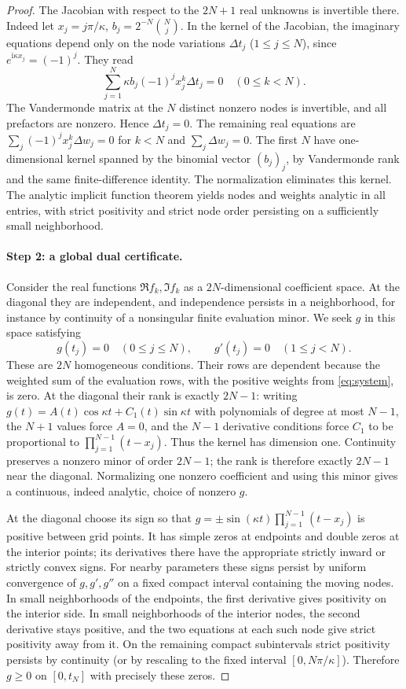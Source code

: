 \documentclass[11pt]{article}
\theoremstyle{remark}\newtheorem{remark}[theorem]{Remark}
\newcommand{\ii}{\mathrm i}
\begin{document}
\begin{proof}
The Jacobian with respect to the $2N+1$ real unknowns is invertible there. Indeed let $x_j=j\pi/\kappa$, $b_j=2^{-N}\binom Nj$. In the kernel of the Jacobian, the imaginary equations depend only on the node variations $\Delta t_j$ ($1\le j\le N$), since $e^{\ii\kappa x_j}=(-1)^j$. They read
\[
 \sum_{j=1}^N \kappa b_j(-1)^j x_j^k\Delta t_j=0\quad(0\le k<N).
\]
The Vandermonde matrix at the $N$ distinct nonzero nodes is invertible, and all prefactors are nonzero. Hence $\Delta t_j=0$. The remaining real equations are $\sum_j(-1)^j x_j^k\Delta w_j=0$ for $k<N$ and $\sum_j\Delta w_j=0$. The first $N$ have one-dimensional kernel spanned by the binomial vector $(b_j)_j$, by Vandermonde rank and the same finite-difference identity. The normalization eliminates this kernel. The analytic implicit function theorem yields nodes and weights analytic in all entries, with strict positivity and strict node order persisting on a sufficiently small neighborhood.

\paragraph{Step 2: a global dual certificate.} Consider the real functions $\Re f_k,\Im f_k$ as a $2N$-dimensional coefficient space. At the diagonal they are independent, and independence persists in a neighborhood, for instance by continuity of a nonsingular finite evaluation minor. We seek $g$ in this space satisfying
\begin{equation}\label{eq:dualconditions}
 g(t_j)=0\quad(0\le j\le N),\qquad g'(t_j)=0\quad(1\le j<N).
\end{equation}
These are $2N$ homogeneous conditions. Their rows are dependent because the weighted sum of the evaluation rows, with the positive weights from \eqref{eq:system}, is zero. At the diagonal their rank is exactly $2N-1$: writing $g(t)=A(t)\cos\kappa t+C_1(t)\sin\kappa t$ with polynomials of degree at most $N-1$, the $N+1$ values force $A=0$, and the $N-1$ derivative conditions force $C_1$ to be proportional to $\prod_{j=1}^{N-1}(t-x_j)$. Thus the kernel has dimension one. Continuity preserves a nonzero minor of order $2N-1$; the rank is therefore exactly $2N-1$ near the diagonal. Normalizing one nonzero coefficient and using this minor gives a continuous, indeed analytic, choice of nonzero $g$.

At the diagonal choose its sign so that $g=\pm\sin(\kappa t)\prod_{j=1}^{N-1}(t-x_j)$ is positive between grid points. It has simple zeros at endpoints and double zeros at the interior points; its derivatives there have the appropriate strictly inward or strictly convex signs. For nearby parameters these signs persist by uniform convergence of $g,g',g''$ on a fixed compact interval containing the moving nodes. In small neighborhoods of the endpoints, the first derivative gives positivity on the interior side. In small neighborhoods of the interior nodes, the second derivative stays positive, and the two equations at each such node give strict positivity away from it. On the remaining compact subintervals strict positivity persists by continuity (or by rescaling to the fixed interval $[0,N\pi/\kappa]$). Therefore $g\ge0$ on $[0,t_N]$ with precisely these zeros.


\end{proof}
\end{document}
